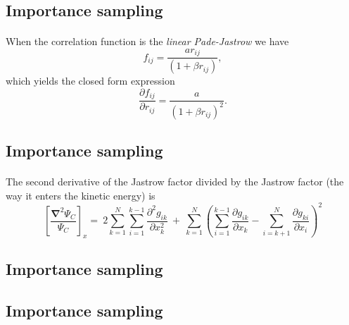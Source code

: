 \documentclass[%
twoside,                 %
final,                   %
10pt]{article}
\begin{document}
{{{{{{%
\subsection{Importance sampling}

\paragraph{}
When the correlation function is the \emph{linear Pade-Jastrow} we have
\[
f_{ij} = \frac{a r_{ij}}{(1 + \beta r_{ij})},
\]
which yields the closed form expression
\[
\frac{\partial f_{ij}}{\partial r_{ij}} = \frac{a}{(1 + \beta r_{ij})^2}.
\]




\subsection{Importance sampling}

\paragraph{}
The second derivative of the Jastrow factor divided by the Jastrow factor (the way it enters the kinetic energy) is
\[
\left[\frac{\mathbf{\nabla}^2 \Psi_C}{\Psi_C}\right]_x =\  
2\sum_{k=1}^{N}
\sum_{i=1}^{k-1}\frac{\partial^2 g_{ik}}{\partial x_k^2}\ +\ 
\sum_{k=1}^N
\left(
\sum_{i=1}^{k-1}\frac{\partial g_{ik}}{\partial x_k} -
\sum_{i=k+1}^{N}\frac{\partial g_{ki}}{\partial x_i}
\right)^2
\]


\subsection{Importance sampling}

\paragraph{}






\subsection{Importance sampling}

}}}}}}
\end{document}
